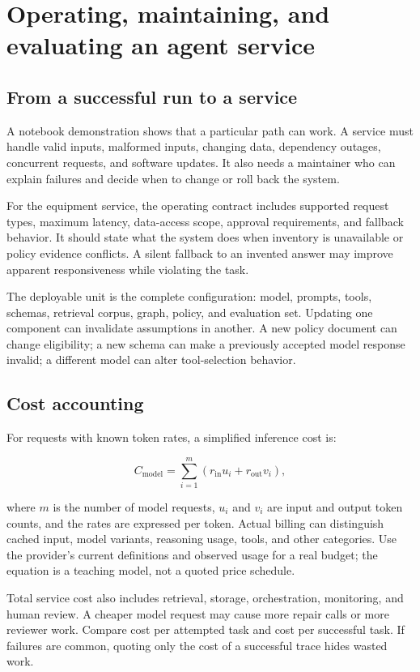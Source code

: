 \chapter{Operating, maintaining, and evaluating an agent service}
\section{From a successful run to a service}
A notebook demonstration shows that a particular path can work. A service must handle valid inputs, malformed inputs, changing data, dependency outages, concurrent requests, and software updates. It also needs a maintainer who can explain failures and decide when to change or roll back the system.

For the equipment service, the operating contract includes supported request types, maximum latency, data-access scope, approval requirements, and fallback behavior. It should state what the system does when inventory is unavailable or policy evidence conflicts. A silent fallback to an invented answer may improve apparent responsiveness while violating the task.

The deployable unit is the complete configuration: model, prompts, tools, schemas, retrieval corpus, graph, policy, and evaluation set. Updating one component can invalidate assumptions in another. A new policy document can change eligibility; a new schema can make a previously accepted model response invalid; a different model can alter tool-selection behavior.

\section{Cost accounting}
For requests with known token rates, a simplified inference cost is:

\begin{equation}
C_{\text{model}}=\sum_{i=1}^{m}\left(r_{\text{in}}u_i+r_{\text{out}}v_i\right),
\end{equation}

where \(m\) is the number of model requests, \(u_i\) and \(v_i\) are input and output token counts, and the rates are expressed per token. Actual billing can distinguish cached input, model variants, reasoning usage, tools, and other categories. Use the provider's current definitions and observed usage for a real budget; the equation is a teaching model, not a quoted price schedule.

Total service cost also includes retrieval, storage, orchestration, monitoring, and human review. A cheaper model request may cause more repair calls or more reviewer work. Compare cost per attempted task and cost per successful task. If failures are common, quoting only the cost of a successful trace hides wasted work.

